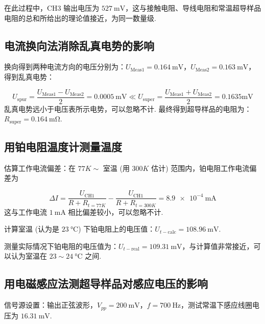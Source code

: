 \documentclass{THUexprep}
\begin{document}
在此过程中，CH3 输出电压为 $\SI{527}{\milli\volt}$，这与接触电阻、导线电阻和常温超导样品电阻的总和所给出的理论值接近，为同一数量级.

\subsection{电流换向法消除乱真电势的影响}

换向得到两种电流方向的电压分别为：$U_\text{Meas1}=\SI{0.164}{\milli\volt}$，$U_\text{Meas2}=\SI{0.163}{\milli\volt}$，得到乱真电势：

\begin{equation}
    U_\text{spur} = \frac{U_\text{Meas1} - U_\text{Meas2}}{2} = \SI{0.0005}{\milli\volt}\ll U_\text{super}=\frac{U_\text{Meas1}+U_\text{Meas2}}{2}=0.1635\si{\milli\volt}
\end{equation}
\newline
乱真电势远小于电压表所示电势，可以忽略不计. 最终得到超导样品的电阻为：$R_\text{super}=\SI{0.164}{\milli\ohm}$.

\subsection{用铂电阻温度计测量温度}

估算工作电流偏差：在 $\si{77}{K}\sim$ 室温 (用 $\si{300}{K}$ 估计) 范围内，铂电阻工作电流偏差为

\begin{equation}
    \Delta I = \frac{U_{\text{CH1}}}{R+R_{t=\si{77}{K}}} - \frac{U_{\text{CH1}}}{R+R_{t=\si{300}{K}}} = \SI{8.9e-4}{\milli\ampere}
\end{equation}
\newline
这与工作电流 $\SI{1}{\milli\ampere}$ 相比偏差较小，可以忽略不计.

计算室温 (认为是 $\SI{23}{\celsius}$) 下铂电阻上的电压值：$U_{t-\text{calc}}=\SI{108.96}{\milli\volt}$.

测量实际情况下铂电阻的电压值为：$U_{t-\text{real}}=\SI{109.31}{\milli\volt}$，与计算值非常接近，可以认为室温在 $23\sim\SI{24}{\celsius}$ 之间.

\subsection{用电磁感应法测超导样品对感应电压的影响}

信号源设置：输出正弦波形，$V_{pp}=\SI{200}{\milli\volt}$，$f=\SI{700}{\hertz}$，测试常温下感应线圈电压为 $\SI{16.31}{\milli\volt}$.
\end{document}
